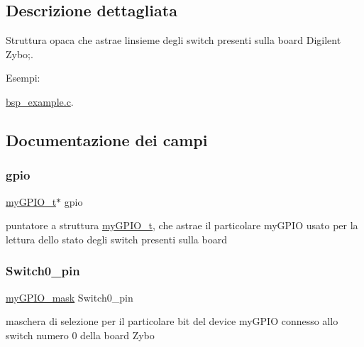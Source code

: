 \subsection{Descrizione dettagliata}
Struttura opaca che astrae l\textquotesingle{}insieme degli switch presenti sulla board Digilent Zybo;. \begin{Desc}
\item[Esempi\+: ]\par
\hyperlink{bsp_example_8c-example}{bsp\+\_\+example.\+c}.\end{Desc}


\subsection{Documentazione dei campi}
\mbox{\label{struct_zybo_switch__t_ac37ddc7c58d246d233dfb38037020184}} 
\subsubsection{\texorpdfstring{gpio}{gpio}}
{\footnotesize\ttfamily \hyperlink{structmy_g_p_i_o__t}{my\+G\+P\+I\+O\+\_\+t}$\ast$ gpio}

puntatore a struttura \hyperlink{structmy_g_p_i_o__t}{my\+G\+P\+I\+O\+\_\+t}, che astrae il particolare my\+G\+P\+IO usato per la lettura dello stato degli switch presenti sulla board \mbox{\label{struct_zybo_switch__t_aa125c82837d72bdb20a0e22f3a86646e}} 
\subsubsection{\texorpdfstring{Switch0\+\_\+pin}{Switch0\_pin}}
{\footnotesize\ttfamily \hyperlink{group__bare-metal_ga402a0d20afc0cb7c25554b8b023f4253}{my\+G\+P\+I\+O\+\_\+mask} Switch0\+\_\+pin}

maschera di selezione per il particolare bit del device my\+G\+P\+IO connesso allo switch numero 0 della board Zybo \mbox{\label{struct_zybo_switch__t_aa031241ea0c12a6f327d3697113e992c}} 
